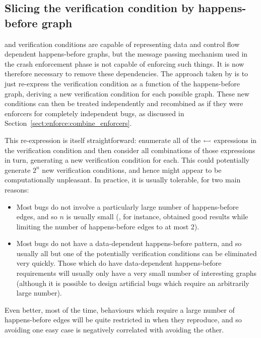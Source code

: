 \subsection{Slicing the verification condition by happens-before graph}
\label{sect:enforce:slice_hb_graph}

{\STateMachines} and verification conditions are capable of
representing data and control flow dependent happens-before graphs,
but the message passing mechanism used in the crash enforcement phase
is not capable of enforcing such things.  It is now therefore
necessary to remove these dependencies.  The approach taken by
{\implementation} is to just re-express the verification condition as
a function of the happens-before graph, deriving a new verification
condition for each possible graph.  These new conditions can then be
treated independently and recombined as if they were enforcers for
completely independent bugs, as discussed in
Section~\ref{sect:enforce:combine_enforcers}.

This re-expression is itself straightforward: enumerate all of the
$\leftarrowtail$ expressions in the verification condition and
then consider all combinations of those expressions in turn,
generating a new verification condition for each.  This could
potentially generate $2^n$ new verification conditions, and hence
might appear to be computationally unpleasant.  In practice, it is
usually tolerable, for two main reasons:

\begin{itemize}
\item
  Most bugs do not involve a particularly large number of
  happens-before edges, and so $n$ is usually small (, for instance, obtained good
  results while limiting the number of happens-before edges to at most
  2).
\item
  Most bugs do not have a data-dependent happens-before pattern, and
  so usually all but one of the potentially verification conditions
  can be eliminated very quickly.  Those which do have data-dependent
  happens-before requirements will usually only have a very small
  number of interesting graphs (although it is possible to design
  artificial bugs which require an arbitrarily large number).
\end{itemize}

Even better, most of the time, behaviours which require a large number
of happens-before edges will be quite restricted in when they
reproduce, and so avoiding one easy case is negatively correlated with
avoiding the other.

